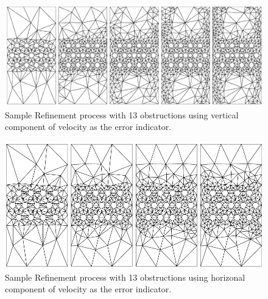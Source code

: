 \documentclass[wrr]{agutex}  %
\begin{document}
\begin{article}
%
%
\break
\begin{figure}[h]
\includegraphics[height=\h]{../plots/v_13_row.pdf}
\caption{Sample Refinement process with 13 obstructions using vertical component of velocity as the error indicator.}   
\end{figure}

\setcounter{subfigure}{0}
\begin{figure}[h]
\includegraphics[height=\h]{../plots/u_13_row.pdf}
\caption{Sample Refinement process with 13 obstructions using horizonal component of velocity as the error indicator.}   
\end{figure}


\end{article}
\end{document}
